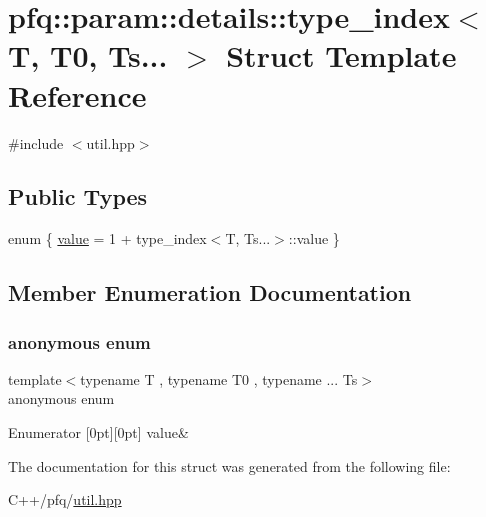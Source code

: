 \hypertarget{structpfq_1_1param_1_1details_1_1type__index_3_01T_00_01T0_00_01Ts_8_8_8_01_4}{}\section{pfq\+:\+:param\+:\+:details\+:\+:type\+\_\+index$<$ T, T0, Ts... $>$ Struct Template Reference}
\label{structpfq_1_1param_1_1details_1_1type__index_3_01T_00_01T0_00_01Ts_8_8_8_01_4}


{\ttfamily \#include $<$util.\+hpp$>$}

\subsection*{Public Types}
\begin{DoxyCompactItemize}
\item 
enum \{ \hyperlink{structpfq_1_1param_1_1details_1_1type__index_3_01T_00_01T0_00_01Ts_8_8_8_01_4_a6ff107e7b04e2b3add359d1ae3699e2baeff7991763d1fdf0ed2d33266d343bc6}{value} = 1 + type\+\_\+index$<$T, Ts...$>$\+:\+:value
 \}
\end{DoxyCompactItemize}


\subsection{Member Enumeration Documentation}
\mbox{\label{structpfq_1_1param_1_1details_1_1type__index_3_01T_00_01T0_00_01Ts_8_8_8_01_4_a6ff107e7b04e2b3add359d1ae3699e2b}} 
\subsubsection{\texorpdfstring{anonymous enum}{anonymous enum}}
{\footnotesize\ttfamily template$<$typename T , typename T0 , typename ... Ts$>$ \\
anonymous enum}

\begin{DoxyEnumFields}{Enumerator}
[0pt][0pt]{}\mbox{\label{structpfq_1_1param_1_1details_1_1type__index_3_01T_00_01T0_00_01Ts_8_8_8_01_4_a6ff107e7b04e2b3add359d1ae3699e2baeff7991763d1fdf0ed2d33266d343bc6}} 
value&\\
\hline

\end{DoxyEnumFields}


The documentation for this struct was generated from the following file\+:\begin{DoxyCompactItemize}
\item 
C++/pfq/\hyperlink{util_8hpp}{util.\+hpp}\end{DoxyCompactItemize}
